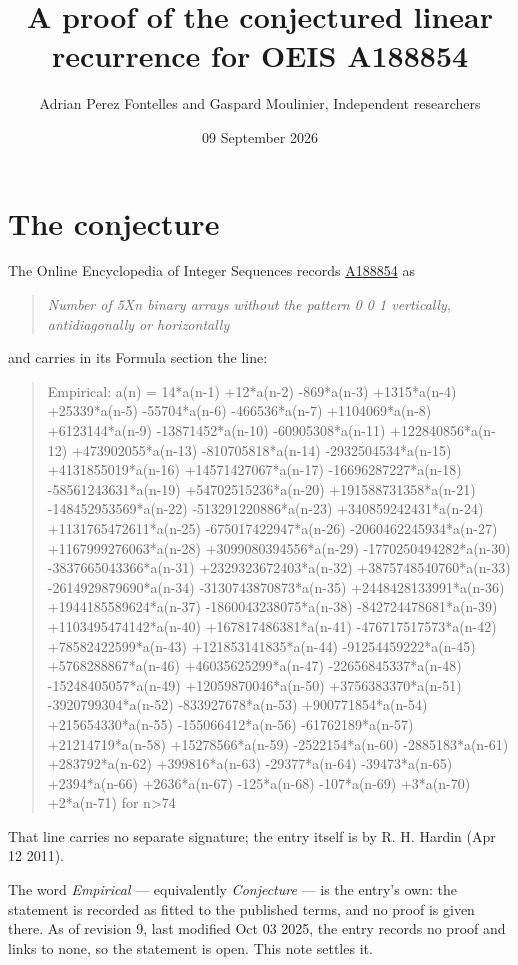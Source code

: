 \documentclass[11pt]{article}
\title{A proof of the conjectured linear recurrence for OEIS A188854}
\author{Adrian Perez Fontelles and Gaspard Moulinier, Independent researchers}
\date{09 September 2026}
\theoremstyle{definition}
\begin{document}
\maketitle
\section{The conjecture}

The Online Encyclopedia of Integer Sequences records \href{https://oeis.org/A188854}{A188854} as

\begin{quote}\itshape Number of 5Xn binary arrays without the pattern 0 0 1 vertically, antidiagonally or horizontally\end{quote}

and carries in its Formula section the line:

\begin{quote}\ttfamily Empirical: a(n) = 14*a(n-1) +12*a(n-2) -869*a(n-3) +1315*a(n-4) +25339*a(n-5) -55704*a(n-6) -466536*a(n-7) +1104069*a(n-8) +6123144*a(n-9) -13871452*a(n-10) -60905308*a(n-11) +122840856*a(n-12) +473902055*a(n-13) -810705818*a(n-14) -2932504534*a(n-15) +4131855019*a(n-16) +14571427067*a(n-17) -16696287227*a(n-18) -58561243631*a(n-19) +54702515236*a(n-20) +191588731358*a(n-21) -148452953569*a(n-22) -513291220886*a(n-23) +340859242431*a(n-24) +1131765472611*a(n-25) -675017422947*a(n-26) -2060462245934*a(n-27) +1167999276063*a(n-28) +3099080394556*a(n-29) -1770250494282*a(n-30) -3837665043366*a(n-31) +2329323672403*a(n-32) +3875748540760*a(n-33) -2614929879690*a(n-34) -3130743870873*a(n-35) +2448428133991*a(n-36) +1944185589624*a(n-37) -1860043238075*a(n-38) -842724478681*a(n-39) +1103495474142*a(n-40) +167817486381*a(n-41) -476717517573*a(n-42) +78582422599*a(n-43) +121853141835*a(n-44) -91254459222*a(n-45) +5768288867*a(n-46) +46035625299*a(n-47) -22656845337*a(n-48) -15248405057*a(n-49) +12059870046*a(n-50) +3756383370*a(n-51) -3920799304*a(n-52) -833927678*a(n-53) +900771854*a(n-54) +215654330*a(n-55) -155066412*a(n-56) -61762189*a(n-57) +21214719*a(n-58) +15278566*a(n-59) -2522154*a(n-60) -2885183*a(n-61) +283792*a(n-62) +399816*a(n-63) -29377*a(n-64) -39473*a(n-65) +2394*a(n-66) +2636*a(n-67) -125*a(n-68) -107*a(n-69) +3*a(n-70) +2*a(n-71) for n>74\end{quote}

That line carries no separate signature; the entry itself is by R. H. Hardin (Apr 12 2011).

The word {\itshape Empirical} --- equivalently {\itshape Conjecture} --- is the entry's own: the statement is recorded as fitted to the published terms, and no proof is given there. As of revision 9, last modified Oct 03 2025, the entry records no proof and links to none, so the statement is open. This note settles it.
\end{document}
